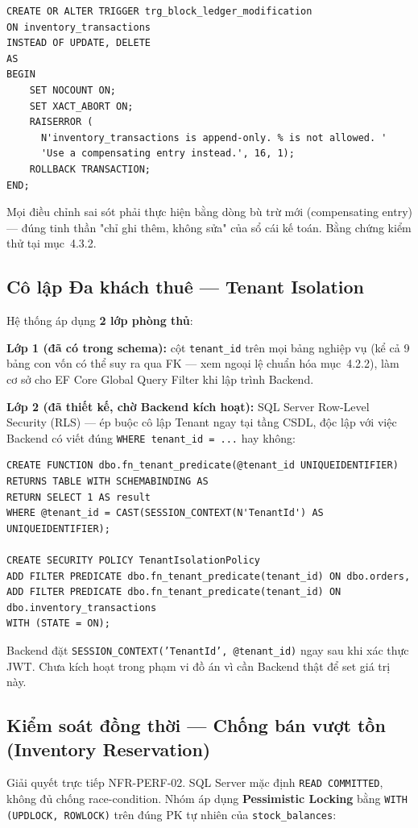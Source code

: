 \begin{lstlisting}
CREATE OR ALTER TRIGGER trg_block_ledger_modification
ON inventory_transactions
INSTEAD OF UPDATE, DELETE
AS
BEGIN
    SET NOCOUNT ON;
    SET XACT_ABORT ON;
    RAISERROR (
      N'inventory_transactions is append-only. % is not allowed. '
      'Use a compensating entry instead.', 16, 1);
    ROLLBACK TRANSACTION;
END;
\end{lstlisting}

Mọi điều chỉnh sai sót phải thực hiện bằng dòng bù trừ mới (compensating entry) — đúng tinh thần "chỉ ghi thêm, không sửa" của sổ cái kế toán. Bằng chứng kiểm thử tại mục~4.3.2.

\subsection{Cô lập Đa khách thuê — Tenant Isolation}
Hệ thống áp dụng \textbf{2 lớp phòng thủ}:

\textbf{Lớp 1 (đã có trong schema):} cột \texttt{tenant\_id} trên mọi bảng nghiệp vụ (kể cả 9 bảng con vốn có thể suy ra qua FK — xem ngoại lệ chuẩn hóa mục~4.2.2), làm cơ sở cho EF Core Global Query Filter khi lập trình Backend.

\textbf{Lớp 2 (đã thiết kế, chờ Backend kích hoạt):} SQL Server Row-Level Security (RLS) — ép buộc cô lập Tenant ngay tại tầng CSDL, độc lập với việc Backend có viết đúng \texttt{WHERE tenant\_id = ...} hay không:
\begin{lstlisting}
CREATE FUNCTION dbo.fn_tenant_predicate(@tenant_id UNIQUEIDENTIFIER)
RETURNS TABLE WITH SCHEMABINDING AS
RETURN SELECT 1 AS result
WHERE @tenant_id = CAST(SESSION_CONTEXT(N'TenantId') AS UNIQUEIDENTIFIER);

CREATE SECURITY POLICY TenantIsolationPolicy
ADD FILTER PREDICATE dbo.fn_tenant_predicate(tenant_id) ON dbo.orders,
ADD FILTER PREDICATE dbo.fn_tenant_predicate(tenant_id) ON dbo.inventory_transactions
WITH (STATE = ON);
\end{lstlisting}
Backend đặt \texttt{SESSION\_CONTEXT('TenantId', @tenant\_id)} ngay sau khi xác thực JWT. Chưa kích hoạt trong phạm vi đồ án vì cần Backend thật để set giá trị này.

\subsection{Kiểm soát đồng thời — Chống bán vượt tồn (Inventory Reservation)}
\label{sec:concurrency-control}
Giải quyết trực tiếp NFR-PERF-02. SQL Server mặc định \texttt{READ COMMITTED}, không đủ chống race-condition. Nhóm áp dụng \textbf{Pessimistic Locking} bằng \texttt{WITH (UPDLOCK, ROWLOCK)} trên đúng PK tự nhiên của \texttt{stock\_balances}:

